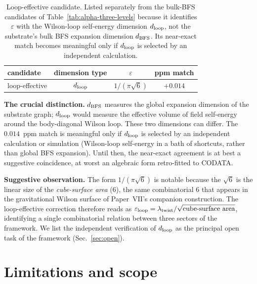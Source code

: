 \documentclass[11pt,a4paper]{article}
\begin{document}
\begin{table}[h]
\centering
\begin{tabular}{lccc}
\toprule
candidate & dimension type & $\varepsilon$ & ppm match\\
\midrule
loop-effective & $d_{\rm loop}$ & $1/(\pi\sqrt{6})$ & $+0.014$\\
\bottomrule
\end{tabular}
\caption{Loop-effective candidate. Listed separately from the
bulk-BFS candidates of Table~\ref{tab:alpha-three-levels}
because it identifies $\varepsilon$ with the Wilson-loop
self-energy dimension $d_{\rm loop}$, not the substrate's
bulk BFS expansion dimension $d_{\rm BFS}$. Its near-exact
match becomes meaningful only if $d_{\rm loop}$ is selected
by an independent calculation.}
\label{tab:loop-eff}
\end{table}

\textbf{The crucial distinction.} $d_{\rm BFS}$ measures the
global expansion dimension of the substrate graph; $d_{\rm
loop}$ would measure the effective volume of field self-energy
around the body-diagonal Wilson loop. These two dimensions can
differ. The $0.014$~ppm match is meaningful only if
$d_{\rm loop}$ is selected by an independent calculation or
simulation (Wilson-loop self-energy in a bath of shortcuts,
rather than global BFS expansion). Until then, the near-exact
agreement is at best a suggestive coincidence, at worst an
algebraic form retro-fitted to CODATA.

\textbf{Suggestive observation.} The form $1/(\pi\sqrt{6})$ is
notable because the $\sqrt{6}$ is the linear size of the
\emph{cube-surface area} (6), the same combinatorial $6$ that
appears in the gravitational Wilson surface of Paper~VII's
companion construction. The loop-effective correction therefore
reads as $\varepsilon_{\rm loop} = \lambda_{\rm twist}/\sqrt{\rm
cube\text{-}surface\ area}$, identifying a single combinatorial
relation between three sectors of the framework. We list the
independent verification of $d_{\rm loop}$ as the principal open
task of the framework (Sec.~\ref{sec:open}).

\section{Limitations and scope}
\label{sec:not}
\end{document}
